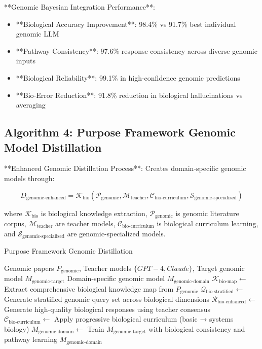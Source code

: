 \documentclass[12pt,a4paper]{article}
\begin{document}
**Genomic Bayesian Integration Performance**:
\begin{itemize}
\item **Biological Accuracy Improvement**: 98.4\% vs 91.7\% best individual genomic LLM
\item **Pathway Consistency**: 97.6\% response consistency across diverse genomic inputs
\item **Biological Reliability**: 99.1\% in high-confidence genomic predictions
\item **Bio-Error Reduction**: 91.8\% reduction in biological hallucinations vs averaging
\end{itemize}

\subsection{Algorithm 4: Purpose Framework Genomic Model Distillation}

**Enhanced Genomic Distillation Process**: Creates domain-specific genomic models through:

\begin{equation}
D_{\text{genomic-enhanced}} = \mathcal{K}_{\text{bio}}(\mathcal{P}_{\text{genomic}}, \mathcal{M}_{\text{teacher}}, \mathcal{C}_{\text{bio-curriculum}}, \mathcal{S}_{\text{genomic-specialized}})
\end{equation}

where $\mathcal{K}_{\text{bio}}$ is biological knowledge extraction, $\mathcal{P}_{\text{genomic}}$ is genomic literature corpus, $\mathcal{M}_{\text{teacher}}$ are teacher models, $\mathcal{C}_{\text{bio-curriculum}}$ is biological curriculum learning, and $\mathcal{S}_{\text{genomic-specialized}}$ are genomic-specialized models.

\begin{algorithm}
\caption{Purpose Framework Genomic Distillation}
\begin{algorithmic}[1]
\Require Genomic papers $P_{\text{genomic}}$, Teacher models $\{GPT-4, Claude\}$, Target genomic model $M_{\text{genomic-target}}$
\Ensure Domain-specific genomic model $M_{\text{genomic-domain}}$
\State $\mathcal{K}_{\text{bio-map}} \leftarrow$ Extract comprehensive biological knowledge map from $P_{\text{genomic}}$
\State $\mathcal{Q}_{\text{bio-stratified}} \leftarrow$ Generate stratified genomic query set across biological dimensions
\State $\mathcal{R}_{\text{bio-enhanced}} \leftarrow$ Generate high-quality biological responses using teacher consensus
\State $\mathcal{C}_{\text{bio-curriculum}} \leftarrow$ Apply progressive biological curriculum (basic → systems biology)
\State $M_{\text{genomic-domain}} \leftarrow$ Train $M_{\text{genomic-target}}$ with biological consistency and pathway learning
\Return $M_{\text{genomic-domain}}$
\end{algorithmic}
\end{algorithm}
\end{document}
